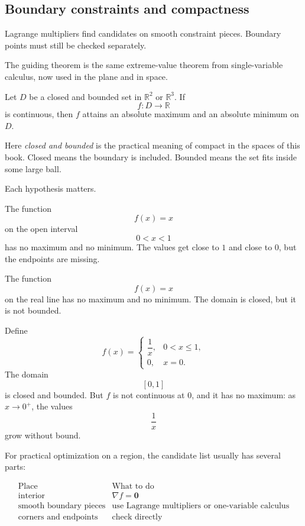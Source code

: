 \subsection{Boundary constraints and compactness}

Lagrange multipliers find candidates on smooth constraint pieces.  Boundary points
must still be checked separately.

The guiding theorem is the same extreme-value theorem from single-variable calculus,
now used in the plane and in space.

\begin{theorem}
Let \(D\) be a closed and bounded set in \(\mathbb R^2\) or \(\mathbb R^3\).  If
\[
    f:D\to\mathbb R
\]
is continuous, then \(f\) attains an absolute maximum and an absolute minimum on
\(D\).
\end{theorem}

Here \emph{closed and bounded} is the practical meaning of compact in the spaces of
this book.  Closed means the boundary is included.  Bounded means the set fits inside
some large ball.

Each hypothesis matters.

\begin{example}
The function
\[
    f(x)=x
\]
on the open interval
\[
    0<x<1
\]
has no maximum and no minimum.  The values get close to \(1\) and close to \(0\),
but the endpoints are missing.
\end{example}

\begin{example}
The function
\[
    f(x)=x
\]
on the real line has no maximum and no minimum.  The domain is closed, but it is
not bounded.
\end{example}

\begin{example}
Define
\[
    f(x)=
    \begin{cases}
    \dfrac1x, & 0<x\le1,\\[2mm]
    0, & x=0.
    \end{cases}
\]
The domain
\[
    [0,1]
\]
is closed and bounded.  But \(f\) is not continuous at \(0\), and it has no maximum:
as \(x\to0^+\), the values
\[
    \frac1x
\]
grow without bound.
\end{example}

For practical optimization on a region, the candidate list usually has several parts:

\[
\begin{array}{c|l}
\text{Place} & \text{What to do}\\ \hline
\text{interior} & \nabla f=\mathbf 0\\[1mm]
\text{smooth boundary pieces} & \text{use Lagrange multipliers or one-variable calculus}\\[1mm]
\text{corners and endpoints} & \text{check directly}
\end{array}
\]

